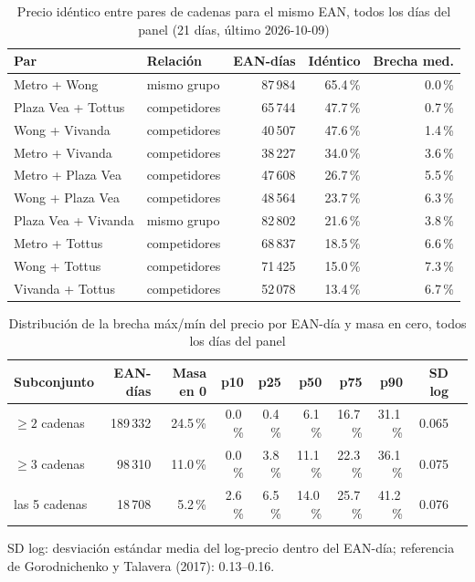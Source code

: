 
\begin{table}[htbp]
\caption{Precio id\'entico entre pares de cadenas para el mismo EAN, todos los d\'ias del panel (21 d\'ias, \'ultimo 2026-10-09)}
\label{tab:identidad}
\centering\scriptsize\setlength{\tabcolsep}{3pt}
\begin{tabular}{@{}llrrr@{}}
\toprule
Par & Relaci\'on & EAN-d\'ias & Id\'entico & Brecha med. \\
\midrule
Metro + Wong & mismo grupo & 87\,984 & 65.4\,\% & 0.0\,\% \\
Plaza Vea + Tottus & competidores & 65\,744 & 47.7\,\% & 0.7\,\% \\
Wong + Vivanda & competidores & 40\,507 & 47.6\,\% & 1.4\,\% \\
Metro + Vivanda & competidores & 38\,227 & 34.0\,\% & 3.6\,\% \\
Metro + Plaza Vea & competidores & 47\,608 & 26.7\,\% & 5.5\,\% \\
Wong + Plaza Vea & competidores & 48\,564 & 23.7\,\% & 6.3\,\% \\
Plaza Vea + Vivanda & mismo grupo & 82\,802 & 21.6\,\% & 3.8\,\% \\
Metro + Tottus & competidores & 68\,837 & 18.5\,\% & 6.6\,\% \\
Wong + Tottus & competidores & 71\,425 & 15.0\,\% & 7.3\,\% \\
Vivanda + Tottus & competidores & 52\,078 & 13.4\,\% & 6.7\,\% \\
\bottomrule\end{tabular}\end{table}

\begin{table}[t]
\caption{Distribuci\'on de la brecha m\'ax/m\'in del precio por EAN-d\'ia y masa en cero, todos los d\'ias del panel}
\label{tab:brecha}
\centering\scriptsize\setlength{\tabcolsep}{4pt}
\begin{tabular}{@{}lrrrrrrrrr@{}}
\toprule
Subconjunto & EAN-d\'ias & Masa en 0 & p10 & p25 & p50 & p75 & p90 & SD log \\
\midrule
$\geq 2$ cadenas & 189\,332 & 24.5\,\% & 0.0\,\% & 0.4\,\% & 6.1\,\% & 16.7\,\% & 31.1\,\% & 0.065 \\
$\geq 3$ cadenas & 98\,310 & 11.0\,\% & 0.0\,\% & 3.8\,\% & 11.1\,\% & 22.3\,\% & 36.1\,\% & 0.075 \\
las 5 cadenas & 18\,708 & 5.2\,\% & 2.6\,\% & 6.5\,\% & 14.0\,\% & 25.7\,\% & 41.2\,\% & 0.076 \\
\bottomrule\end{tabular}
\par\smallskip\raggedright\scriptsize SD log: desviaci\'on est\'andar media del log-precio dentro del EAN-d\'ia; referencia de Gorodnichenko y Talavera (2017): 0.13--0.16.
\end{table}

